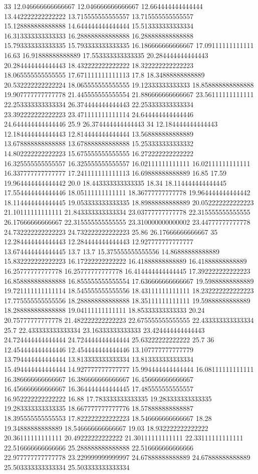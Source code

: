 33 12.046666666666667 12.046666666666667 12.664444444444444 13.442222222222222 13.715555555555557 13.715555555555557 15.128888888888888 14.644444444444444 15.513333333333334 16.313333333333333 16.288888888888888 16.288888888888888 15.793333333333335 15.793333333333335 16.186666666666667 17.09111111111111 16.63 16.91888888888889 17.553333333333335 20.284444444444443 20.284444444444443 18.432222222222222 18.322222222222223 18.065555555555555 17.671111111111113 17.8 18.34888888888889 20.532222222222224 18.065555555555555 19.12333333333333 18.858888888888888 19.907777777777778 21.445555555555554 21.886666666666667 23.56111111111111 22.253333333333334 26.374444444444443 22.253333333333334 23.392222222222223 23.471111111111114 24.644444444444446 24.644444444444446 25.9 26.374444444444443
34 12.184444444444443 12.184444444444443 12.814444444444444 13.568888888888889 13.678888888888888 13.678888888888888 15.253333333333332 14.802222222222223 15.675555555555555 16.272222222222222 16.325555555555557 16.325555555555557 16.02111111111111 16.02111111111111 16.337777777777777 17.241111111111113 16.69888888888889 16.85 17.59 19.964444444444442 20.0 18.443333333333335 18.34 18.114444444444445 17.554444444444446 18.05111111111111 18.36777777777778 19.964444444444442 18.114444444444445 19.053333333333335 18.89888888888889 20.052222222222223 21.10111111111111 21.843333333333334 23.03777777777778 22.315555555555555 26.17666666666667 22.315555555555555 23.310000000000002 23.44777777777778 24.732222222222223 24.732222222222223 25.86 26.17666666666667
35 12.284444444444443 12.284444444444443 12.927777777777777 13.674444444444445 13.7 13.7 15.375555555555556 14.86888888888889 15.832222222222223 16.17222222222222 16.41888888888889 16.41888888888889 16.25777777777778 16.25777777777778 16.414444444444445 17.392222222222223 16.858888888888888 16.855555555555554 17.636666666666667 19.59888888888889 19.721111111111114 18.545555555555556 18.43111111111111 18.232222222222223 17.775555555555556 18.288888888888888 18.35111111111111 19.59888888888889 18.288888888888888 19.04111111111111 18.85333333333333 20.24 20.75777777777778 21.482222222222223 22.675555555555555 22.433333333333334 25.7 22.433333333333334 23.16333333333333 23.424444444444443 24.724444444444444 24.724444444444444 25.63222222222222 25.7
36 12.454444444444446 12.454444444444446 13.107777777777779 13.794444444444444 13.813333333333334 13.813333333333334 15.494444444444444 14.927777777777777 15.994444444444444 16.08111111111111 16.386666666666667 16.386666666666667 16.456666666666667 16.456666666666667 16.364444444444445 17.485555555555557 16.952222222222222 16.88 17.783333333333335 19.283333333333335 19.283333333333335 18.667777777777776 18.578888888888887 18.395555555555553 17.822222222222223 18.546666666666667 18.28 19.34888888888889 18.546666666666667 19.03 18.932222222222222 20.36111111111111 20.49222222222222 21.30111111111111 22.33111111111111 22.516666666666666 25.288888888888888 22.516666666666666 22.977777777777778 23.229999999999997 24.67888888888889 24.67888888888889 25.503333333333334 25.503333333333334
